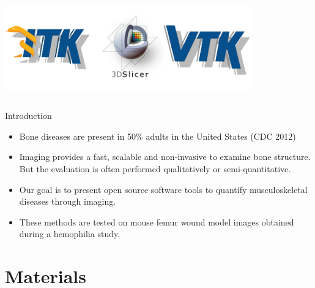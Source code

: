 \documentclass[10pt,aspectratio=169]{beamer}
\begin{document}
\begin{frame}
\begin{columns}[onlytextwidth]
    \includegraphics[width=0.9\textwidth]{./logos/kitware_itk_slicer_vtk_logos.png}
  \end{columns}

\end{frame}

\begin{frame}[fragile]{Introduction}
\begin{itemize} \itemsep1em
\item Bone diseases are present in 50\% adults in the United States (CDC 2012)

\item Imaging provides a fast, scalable and non-invasive to examine bone structure. But the evaluation is often performed qualitatively or semi-quantitative.

\item Our goal is to present open source software tools to quantify musculoskeletal diseases through imaging.

\item These methods are tested on mouse femur wound model images obtained during a hemophilia study.
\end{itemize}
\end{frame}

\section{Materials}
\end{document}
